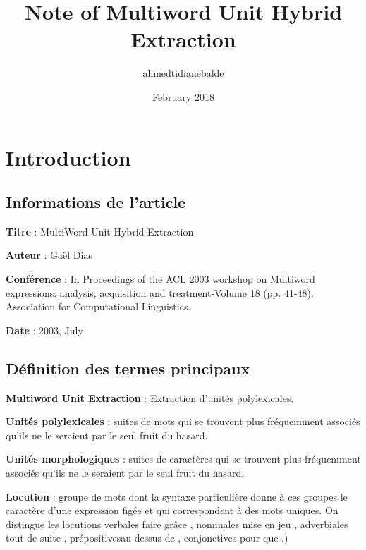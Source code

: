 \documentclass[a4paper,12pt]{article}
\title{Note of Multiword Unit Hybrid Extraction }
\author{ahmedtidianebalde }
\date{February 2018}
\begin{document}
\maketitle

\newpage

\tableofcontents

\newpage

\setlength{\parindent}{0cm} %

\section{Introduction}

    \subsection{Informations de l'article}
    
        \textbf{Titre} : MultiWord Unit Hybrid Extraction 
        
        \textbf{Auteur} : Gaël Dias
        
        \textbf{Conférence} : In Proceedings of the ACL 2003 workshop on Multiword expressions: analysis, acquisition and treatment-Volume 18 (pp. 41-48). Association for Computational Linguistics.
        
        \textbf{Date} : 2003, July
    
    \subsection{Définition des termes principaux}
        
        \textbf{Multiword Unit Extraction} : Extraction d'unités polylexicales.
        
        \textbf{Unités polylexicales} : suites de mots qui se trouvent plus fréquemment associés qu'ils ne le seraient par le 
        seul fruit du hasard.
        
        \textbf{Unités morphologiques} : suites de caractères qui se trouvent plus fréquemment associés qu'ils ne le seraient par le seul fruit du hasard.
        
        \textbf{Locution} : groupe de mots dont la syntaxe particulière donne à ces groupes le caractère d'une expression figée et qui correspondent à des mots uniques. On distingue les locutions verbales \lbrack faire grâce \rbrack, nominales \lbrack mise en jeu \rbrack, adverbiales \lbrack tout de suite \rbrack, prépositives\lbrack au-dessus de \rbrack, conjonctives \lbrack pour que \rbrack.)
        
\end{document}
